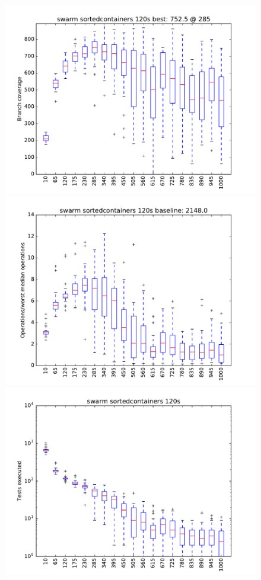 \begin{figure}
\includegraphics[width=\columnwidth]{graphs/sortedcontainersswarm120}
\includegraphics[width=\columnwidth]{graphs/opssortedcontainersswarm120}
\includegraphics[width=\columnwidth]{graphs/execsortedcontainersswarm120}
\end{figure}


